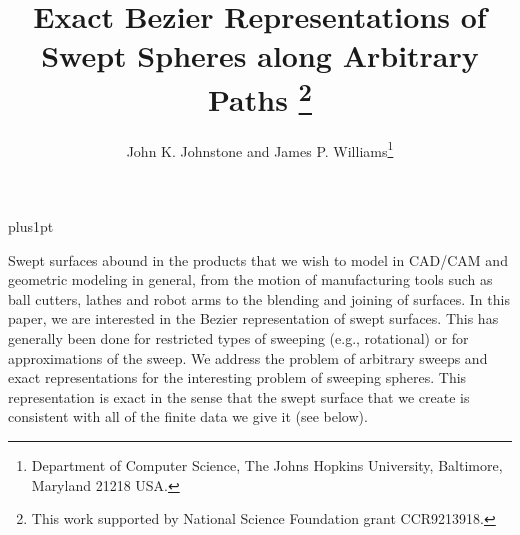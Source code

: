 
\makeatletter
\def\@maketitle{\newpage
\null
\begin{center}
      {\Large\bf \@title \par}  %
      \vskip .5em               %
      {\lineskip .5em           %
\begin{tabular}[t]{c}\@author 
\end{tabular}\par}                   
\end{center}
\par
\vskip .5em}                 %
\makeatother

\parskip=8pt plus1pt
\parindent=0pt

\newcommand{\DoubleSpace}{\edef\baselinestretch{1.4}\Large\normalsize}

\DoubleSpace

\setlength{\oddsidemargin}{0pt}
\setlength{\evensidemargin}{0pt}
\setlength{\headsep}{0pt}
\setlength{\topmargin}{0pt}
\setlength{\textheight}{8.75in}
\setlength{\textwidth}{6.5in}

\title{Exact Bezier Representations of Swept Spheres along Arbitrary Paths
	\thanks{This work supported by National Science Foundation 
	grant CCR9213918.}}
\author{John K. Johnstone 
	and James P. Williams\thanks{Department of Computer Science,
	The Johns Hopkins University,
	Baltimore, Maryland 21218 USA.}}



\maketitle

Swept surfaces abound in the products that we wish to model in CAD/CAM
and geometric modeling in general,
from the motion of manufacturing tools such as ball cutters, lathes and robot 
arms to the blending and joining of surfaces.
In this paper, we are interested in the Bezier representation of swept surfaces.
This has generally been done for restricted
types of sweeping (e.g., rotational) or for approximations of the sweep.
We address the problem of arbitrary sweeps and exact representations
for the interesting problem of sweeping spheres.
This representation is exact in the sense that the swept surface that 
we create is consistent with all of the finite data we give it (see below).

